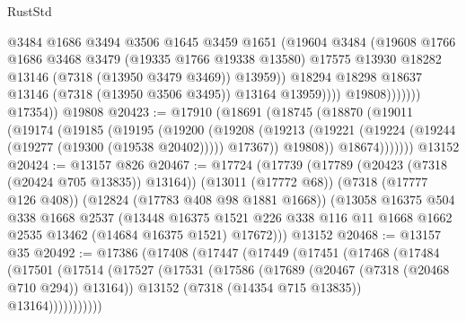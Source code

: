 \begin{lexlean}{RustStd}
\begin{coremodule}
                              @3484
                              @1686
                              @3494
                              @3506
                              @1645
                              @3459
                              @1651
                              (@19604
                                @3484
                                (@19608
                                  @1766
                                  @1686
                                  @3468
                                  @3479
                                  (@19335 @1766 @19338 @13580)
                                  @17575
                                  @13930
                                  @18282
                                  @13146
                                  (@7318 (@13950 @3479 @3469))
                                  @13959))
                              @18294
                              @18298
                              @18637
                              @13146
                              (@7318 (@13950 @3506 @3495))
                              @13164
                              @13959))))
                      @19808)))))))
        @17354))
    @19808
@20423 := @17910
    (@18691
      (@18745
        (@18870
          (@19011
            (@19174
              (@19185
                (@19195
                  (@19200
                    (@19208
                      (@19213 (@19221 (@19224 (@19244 (@19277 (@19300 (@19538 @20402))))) @17367))
                      @19808))
                  @18674)))))))
    @13152
@20424 := @13157 @826
@20467 := @17724
    (@17739
      (@17789 (@20423 (@7318 (@20424 @705 @13835)) @13164))
      (@13011 (@17772 @68))
      (@7318 (@17777 @126 @408))
      (@12824 (@17783 @408 @98 @1881 @1668))
      (@13058
        @16375
        @504
        @338
        @1668
        @2537
        (@13448
          @16375
          @1521
          @226
          @338
          @116
          @11
          @1668
          @1662
          @2535
          @13462
          (@14684 @16375 @1521)
          @17672)))
    @13152
@20468 := @13157 @35
@20492 := @17386
    (@17408
      (@17447
        (@17449
          (@17451
            (@17468
              (@17484
                (@17501
                  (@17514
                    (@17527
                      (@17531
                        (@17586
                          (@17689 (@20467 (@7318 (@20468 @710 @294)) @13164))
                          @13152
                          (@7318 (@14354 @715 @13835))
                          @13164)))))))))))

\end{coremodule}
\end{lexlean}
